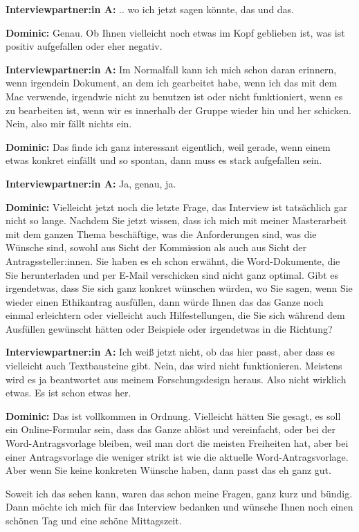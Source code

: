 \documentclass[a4paper,12pt,twoside]{scrreprt}
\begin{document}
\textbf{Interviewpartner:in A:} .. wo ich jetzt sagen könnte, das und das.

\textbf{Dominic:} Genau. Ob Ihnen vielleicht noch etwas im Kopf geblieben ist, was ist positiv aufgefallen oder eher negativ.

\textbf{Interviewpartner:in A:} Im Normalfall kann ich mich schon daran erinnern, wenn irgendein Dokument, an dem ich gearbeitet habe, wenn ich das mit dem Mac verwende, irgendwie nicht zu benutzen ist oder nicht funktioniert, wenn es zu bearbeiten ist, wenn wir es innerhalb der Gruppe wieder hin und her schicken. Nein, also mir fällt nichts ein.

\textbf{Dominic:} Das finde ich ganz interessant eigentlich, weil gerade, wenn einem etwas konkret einfällt und so spontan, dann muss es stark aufgefallen sein.

\textbf{Interviewpartner:in A:} Ja, genau, ja.

\textbf{Dominic:} Vielleicht jetzt noch die letzte Frage, das Interview ist tatsächlich gar nicht so lange. Nachdem Sie jetzt wissen, dass ich mich mit meiner Masterarbeit mit dem ganzen Thema beschäftige, was die Anforderungen sind, was die Wünsche sind, sowohl aus Sicht der Kommission als auch aus Sicht der Antragssteller:innen. Sie haben es eh schon erwähnt, die Word-Dokumente, die Sie herunterladen und per E-Mail verschicken sind nicht ganz optimal. Gibt es irgendetwas, dass Sie sich ganz konkret wünschen würden, wo Sie sagen, wenn Sie wieder einen Ethikantrag ausfüllen, dann würde Ihnen das das Ganze noch einmal erleichtern oder vielleicht auch Hilfestellungen, die Sie sich während dem Ausfüllen gewünscht hätten oder Beispiele oder irgendetwas in die Richtung?

\textbf{Interviewpartner:in A:} Ich weiß jetzt nicht, ob das hier passt, aber dass es vielleicht auch Textbausteine gibt. Nein, das wird nicht funktionieren. Meistens wird es ja beantwortet aus meinem Forschungsdesign heraus. Also nicht wirklich etwas. Es ist schon etwas her.

\textbf{Dominic:} Das ist vollkommen in Ordnung. Vielleicht hätten Sie gesagt, es soll ein Online-Formular sein, dass das Ganze ablöst und vereinfacht, oder bei der Word-Antragsvorlage bleiben, weil man dort die meisten Freiheiten hat, aber bei einer Antragsvorlage die weniger strikt ist wie die aktuelle Word-Antragsvorlage. Aber wenn Sie keine konkreten Wünsche haben, dann passt das eh ganz gut. 

Soweit ich das sehen kann, waren das schon meine Fragen, ganz kurz und bündig. Dann möchte ich mich für das Interview bedanken und wünsche Ihnen noch einen schönen Tag und eine schöne Mittagszeit.
\end{document}
